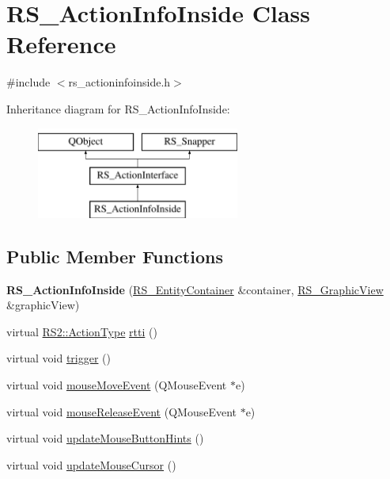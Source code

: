 \hypertarget{classRS__ActionInfoInside}{\section{R\-S\-\_\-\-Action\-Info\-Inside Class Reference}
\label{classRS__ActionInfoInside}
}


{\ttfamily \#include $<$rs\-\_\-actioninfoinside.\-h$>$}

Inheritance diagram for R\-S\-\_\-\-Action\-Info\-Inside\-:\begin{figure}[H]
\begin{center}
\leavevmode
\includegraphics[height=3.000000cm]{classRS__ActionInfoInside}
\end{center}
\end{figure}
\subsection*{Public Member Functions}
\begin{DoxyCompactItemize}
\item 
\hypertarget{classRS__ActionInfoInside_a5da2ea2ef935ada8864c8b7cbae41f0b}{{\bfseries R\-S\-\_\-\-Action\-Info\-Inside} (\hyperlink{classRS__EntityContainer}{R\-S\-\_\-\-Entity\-Container} \&container, \hyperlink{classRS__GraphicView}{R\-S\-\_\-\-Graphic\-View} \&graphic\-View)}\label{classRS__ActionInfoInside_a5da2ea2ef935ada8864c8b7cbae41f0b}

\item 
virtual \hyperlink{classRS2_afe3523e0bc41fd637b892321cfc4b9d7}{R\-S2\-::\-Action\-Type} \hyperlink{classRS__ActionInfoInside_a5e488d21ee3bbcff357c7adf82a0ebdd}{rtti} ()
\item 
virtual void \hyperlink{classRS__ActionInfoInside_a16e187e8d86704e38522ebb2787662d1}{trigger} ()
\item 
virtual void \hyperlink{classRS__ActionInfoInside_a2915f8d28cbaf3aa8061c9ddc6dfa811}{mouse\-Move\-Event} (Q\-Mouse\-Event $\ast$e)
\item 
virtual void \hyperlink{classRS__ActionInfoInside_a1eff8d514b334ae76480da763ab6390d}{mouse\-Release\-Event} (Q\-Mouse\-Event $\ast$e)
\item 
virtual void \hyperlink{classRS__ActionInfoInside_a2d4d759101c75687d29d33b855167ad8}{update\-Mouse\-Button\-Hints} ()
\item 
virtual void \hyperlink{classRS__ActionInfoInside_a2a158413b9ae8678d6665b8b10e523d1}{update\-Mouse\-Cursor} ()
\end{DoxyCompactItemize}
